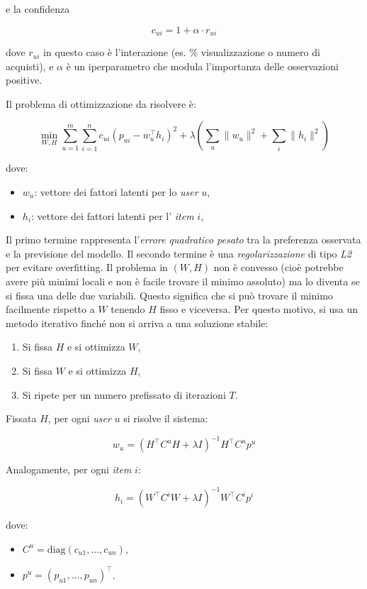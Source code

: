 e la confidenza
    
\[
c_{ui} = 1 + \alpha \cdot r_{ui}
\]

dove $r_{ui}$ in questo caso è l'interazione (es. \% visualizzazione o numero di acquisti), e $\alpha$ è un iperparametro che modula l'importanza delle osservazioni positive.

Il problema di ottimizzazione da risolvere è:

\[
\min_{W, H} \sum_{u=1}^m \sum_{i=1}^n c_{ui} (p_{ui} - w_u^\top h_i)^2 + \lambda \left( \sum_u \|w_u\|^2 + \sum_i \|h_i\|^2 \right)
\]

dove:

\begin{itemize}
    \item $w_u$: vettore dei fattori latenti per lo \textit{user} $u$,
    \item $h_i$: vettore dei fattori latenti per l' \textit{item} $i$,
\end{itemize}

Il primo termine rappresenta l'\textit{errore quadratico pesato} tra la preferenza osservata e la previsione del modello. Il secondo termine è una \textit{regolarizzazione} di tipo \textit{L2} per evitare overfitting. Il problema in $(W,H)$ non è convesso (cioè potrebbe avere più minimi locali e non è facile trovare il minimo assoluto) ma lo diventa se si fissa una delle due variabili. Questo significa che si può trovare il minimo facilmente rispetto a $W$ tenendo $H$ fisso e viceversa. Per questo motivo, si usa un metodo iterativo finché non si arriva a una soluzione stabile:

\begin{enumerate}
    \item Si fissa $H$ e si ottimizza $W$,
    \item Si fissa $W$ e si ottimizza $H$,
    \item Si ripete per un numero prefissato di iterazioni $T$.
\end{enumerate}

Fissata $H$, per ogni \textit{user} $u$ si risolve il sistema:

\[
w_u = \left( H^\top C^u H + \lambda I \right)^{-1} H^\top C^u p^u
\]

Analogamente, per ogni \textit{item} $i$:

\[
h_i = \left( W^\top C^i W + \lambda I \right)^{-1} W^\top C^i p^i
\]

dove:

\begin{itemize}
    \item $C^u = \text{diag}(c_{u1}, \dots, c_{un})$,
    \item $p^u = (p_{u1}, \dots, p_{un})^\top$.
\end{itemize}


